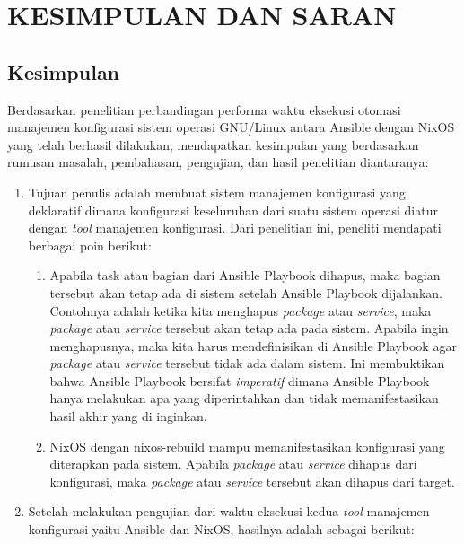\documentclass[10pt,]{report}
\begin{document}
\chapter{KESIMPULAN DAN SARAN}
\section{Kesimpulan}
\begin{adjustwidth}{20pt}{}
	\hspace\parindent
	Berdasarkan penelitian perbandingan performa waktu eksekusi otomasi manajemen
	konfigurasi sistem operasi GNU/Linux antara Ansible dengan NixOS yang telah
	berhasil dilakukan, mendapatkan kesimpulan yang berdasarkan rumusan masalah,
	pembahasan, pengujian, dan hasil penelitian diantaranya:
	\begin{enumerate}[label=\arabic*.]
		\item Tujuan penulis adalah membuat sistem manajemen konfigurasi yang
		      deklaratif dimana konfigurasi keseluruhan dari suatu sistem operasi diatur
		      dengan \textit{tool} manajemen konfigurasi. Dari penelitian ini, peneliti
		      mendapati berbagai poin berikut:
		      \begin{enumerate}[label=\alph*.]
			      \item Apabila task atau bagian dari Ansible Playbook dihapus, maka
			            bagian tersebut akan tetap ada di sistem setelah Ansible Playbook
			            dijalankan. Contohnya adalah ketika kita menghapus \textit{package}
			            atau \textit{service}, maka \textit{package} atau \textit{service}
			            tersebut akan tetap ada pada sistem. Apabila ingin menghapusnya, maka
			            kita harus mendefinisikan di Ansible Playbook agar \textit{package}
			            atau \textit{service} tersebut tidak ada dalam sistem. Ini membuktikan
			            bahwa Ansible Playbook bersifat \textit{imperatif} dimana Ansible
			            Playbook hanya melakukan apa yang diperintahkan dan tidak memanifestasikan
			            hasil akhir yang di inginkan.
			      \item NixOS dengan nixos-rebuild mampu memanifestasikan konfigurasi
			            yang diterapkan pada sistem. Apabila \textit{package} atau
			            \textit{service} dihapus dari konfigurasi, maka \textit{package}
			            atau \textit{service} tersebut akan dihapus dari target.
		      \end{enumerate}
		\item Setelah melakukan pengujian dari waktu eksekusi kedua \textit{tool}
		      manajemen konfigurasi yaitu Ansible dan NixOS, hasilnya adalah sebagai berikut:

\end{enumerate}
\end{adjustwidth}
\end{document}

